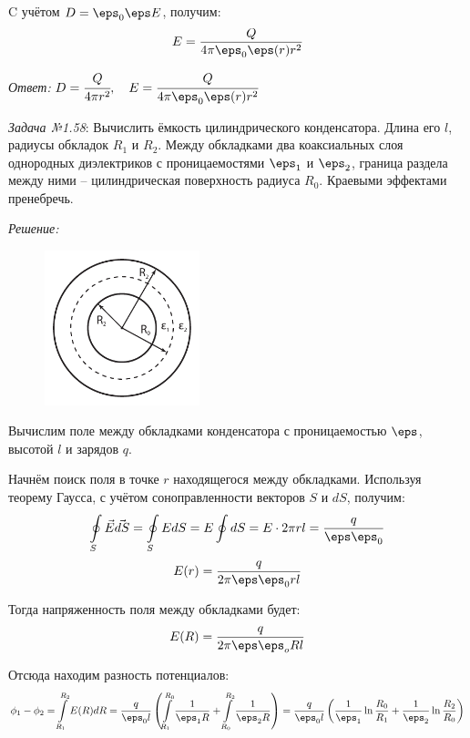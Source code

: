 C учётом \( D = \eps_0\eps E \), получим:
\[
	E = \frac{Q}{4\pi\eps_0\eps(r) r^2}
\]

\emph{Ответ:} \( D = \cfrac{Q}{4\pi r^2},\quad E = \cfrac{Q}{4\pi\eps_0\eps(r) r^2}\)
 
\newpage

\emph{Задача №1.58}: Вычислить ёмкость цилиндрического конденсатора. Длина 
его \( l \), радиусы обкладок \( R_1 \) и \( R_2 \). Между обкладками два 
коаксиальных слоя однородных диэлектриков с проницаемостями \( \eps_1 \) 
и \( \eps_2 \), граница раздела между ними -- цилиндрическая поверхность 
радиуса \( R_0 \). Краевыми эффектами пренебречь.

\emph{Решение:}

\begin{figure}
	\vspace{-2ex}
	\includegraphics[width=0.4\textwidth]{pdf/image_1_58}
\end{figure}

Вычислим поле между обкладками конденсатора с проницаемостью \( \eps \), 
высотой \( l \) и зарядов \( q \). 

Начнём поиск поля в точке \( r \) находящегося между обкладками. Используя 
теорему Гаусса, с учётом соноправленности векторов \( S \) и 
\( dS \), получим:
\[ 
	\oint\limits_S \vec{E}\vec{dS} = \oint\limits_S EdS = 
	E \oint dS = E \cdot 2\pi r l = \frac{q}{\eps\eps_0}
\]
\[
	E(r) = \frac{q}{2\pi\eps\eps_0 rl}
\]

Тогда напряженность поля между обкладками будет:
\[
	E(R) = \frac{q}{2\pi\eps\eps_o Rl}
\]

Отсюда находим разность потенциалов:
\[
	\phi_1 - \phi_2 = \int\limits^{R_2}_{R_1} E(R) dR = 
	\frac{q}{\eps_0 l} \left( 
		\int \limits^{R_0}_{R_1} \frac{1}{\eps_1 R} + 
		\int \limits^{R_2}_{R_0} \frac{1}{\eps_2 R} 
	\right) = 
	\frac{q}{\eps_0 l} \left(
		\frac{1}{\eps_1}\ln\frac{R_0}{R_1} + 
		\frac{1}{\eps_2}\ln\frac{R_2}{R_0}
	\right) 
\]

